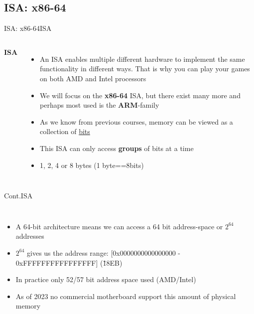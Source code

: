 \documentclass[
	11pt, %
	aspectratio=169, %
]{beamer}
\begin{document}
\subsection{ISA: x86-64}
\def \sectiontitle{ISA}
\begin{frame}{ISA: x86-64}{\sectiontitle}

    \begin{columns}
        \column{\textwidth}
        \textbf{ISA}
        \begin{itemize}
            \item An ISA enables multiple different hardware to implement the same functionality in different ways. That is why you can play your games on both AMD and Intel processors
            \item We will focus on the \textbf{x86-64} ISA, but there exist many more and perhaps most used is the \textbf{ARM}-family
            \item As we know from previous courses, memory can be viewed as a collection of \underline{bits}
            \item This ISA can only access \textbf{groups} of bits at a time
            \item  1, 2, 4 or 8 bytes (1 byte==8bits)
        \end{itemize}
    \end{columns}
\end{frame}
\begin{frame}{Cont.}{\sectiontitle}
    \begin{columns}
        \column{\textwidth}
        \begin{itemize}
            \item A 64-bit architecture means we can access a 64 bit address-space or $2^{64}$ addresses
            \item $2^{64}$ gives us the address  range: [0x0000000000000000 - 0xFFFFFFFFFFFFFFFF] (\~18EB)
            \item In practice only 52/57 bit address space used (AMD/Intel)
            \item As of 2023 no commercial motherboard support this amount of physical memory
        \end{itemize}
    \end{columns}
\end{frame}
\end{document}
